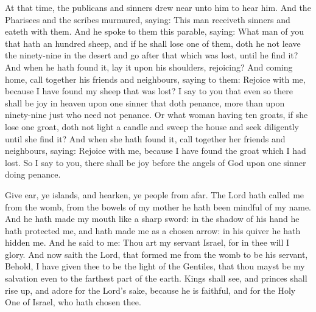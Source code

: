 \begin{multicols}{2}
At that time, the publicans and sinners drew near unto him to hear him.  And the
Pharisees and the scribes murmured, saying: This man receiveth sinners and
eateth with them.  And he spoke to them this parable, saying: What man of you
that hath an hundred sheep, and if he shall lose one of them, doth he not leave
the ninety-nine in the desert and go after that which was lost, until he find
it?  And when he hath found it, lay it upon his shoulders, rejoicing?  And
coming home, call together his friends and neighbours, saying to them: Rejoice
with me, because I have found my sheep that was lost?  I say to you that even
so there shall be joy in heaven upon one sinner that doth penance, more than
upon ninety-nine just who need not penance.  Or what woman having ten groats,
if she lose one groat, doth not light a candle and sweep the house and seek
diligently until she find it?  And when she hath found it, call together her
friends and neighbours, saying: Rejoice with me, because I have found the groat
which I had lost.  So I say to you, there shall be joy before the angels of God
upon one sinner doing penance.


\bigskip




Give ear, ye islands, and hearken, ye people from afar. The Lord
hath called me from the womb, from the bowels of my mother he hath been
mindful of my name.
And he hath made my mouth like a sharp sword: in the shadow of his
hand he hath protected me, and hath made me as a chosen arrow: in his
quiver he hath hidden me.
And he said to me: Thou art my servant Israel, for in thee will I
glory.
And now saith the Lord, that formed me from the womb to be his
servant, %
Behold, I have given thee to be the light of the Gentiles, that thou
mayst be my salvation even to the farthest part of the earth.
Kings shall see, and princes shall rise up, and adore for the
Lord's sake, because he is faithful, and for the Holy One of Israel, who
hath chosen thee.




\end{multicols}

